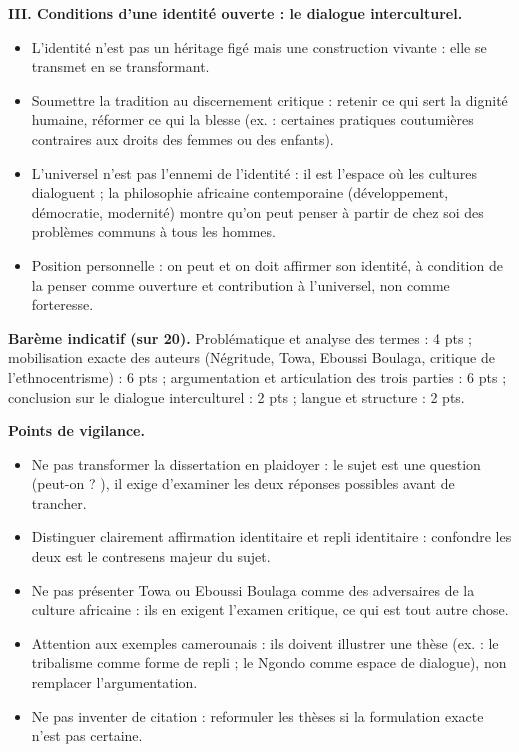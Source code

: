 \documentclass[11pt]{article}
\begin{document}
\begin{corrige}
\textbf{III. Conditions d'une identité ouverte : le dialogue interculturel.}
\begin{itemize}
\item L'identité n'est pas un héritage figé mais une construction vivante : elle se transmet en se transformant.
\item Soumettre la tradition au discernement critique : retenir ce qui sert la dignité humaine, réformer ce qui la blesse (ex. : certaines pratiques coutumières contraires aux droits des femmes ou des enfants).
\item L'universel n'est pas l'ennemi de l'identité : il est l'espace où les cultures dialoguent ; la philosophie africaine contemporaine (développement, démocratie, modernité) montre qu'on peut penser à partir de chez soi des problèmes communs à tous les hommes.
\item Position personnelle : on peut et on doit affirmer son identité, à condition de la penser comme ouverture et contribution à l'universel, non comme forteresse.
\end{itemize}

\textbf{Barème indicatif (sur 20).} Problématique et analyse des termes : 4 pts ; mobilisation exacte des auteurs (Négritude, Towa, Eboussi Boulaga, critique de l'ethnocentrisme) : 6 pts ; argumentation et articulation des trois parties : 6 pts ; conclusion sur le dialogue interculturel : 2 pts ; langue et structure : 2 pts.

\textbf{Points de vigilance.}
\begin{itemize}
\item Ne pas transformer la dissertation en plaidoyer : le sujet est une question (\guillemotleft peut-on ? \guillemotright), il exige d'examiner les deux réponses possibles avant de trancher.
\item Distinguer clairement affirmation identitaire et repli identitaire : confondre les deux est le contresens majeur du sujet.
\item Ne pas présenter Towa ou Eboussi Boulaga comme des adversaires de la culture africaine : ils en exigent l'examen critique, ce qui est tout autre chose.
\item Attention aux exemples camerounais : ils doivent illustrer une thèse (ex. : le tribalisme comme forme de repli ; le Ngondo comme espace de dialogue), non remplacer l'argumentation.
\item Ne pas inventer de citation : reformuler les thèses si la formulation exacte n'est pas certaine.
\end{itemize}

\end{corrige}
\end{document}
